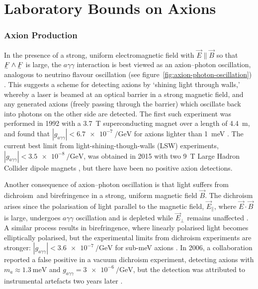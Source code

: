 \section{Laboratory Bounds on Axions}

\subsubsection{Axion Production}
In the presence of a strong, uniform electromagnetic field with $\vec E \parallel \vec B$ so that $\ts F\wedge\ts F$ is large, the $aγγ$ interaction is best viewed as an axion--photon oscillation, analogous to neutrino flavour oscillation (see figure~\ref{fig:axion-photon-oscillation}) \cite[§\,91.3.1]{ParticleDataGroup-review-2020}.
This suggests a scheme for detecting axions by `shining light through walls,' whereby a laser is beamed at an optical barrier in a strong magnetic field, and any generated axions (freely passing through the barrier) which oscillate back into photons on the other side are detected.
The first such experiment was performed in 1992 with a \SI{3.7}{\tesla} superconducting magnet over a length of \SI{4.4}{\meter}, and found that $|g_{aγγ}| < \SI{6.7e-7}{\per\giga\eV}$ for axions lighter than \SI{1}{\milli\eV} \cite{first-LSW-experiment}.
The current best limit from light-shining-though-walls (LSW) experiments, $|g_{aγγ}| < \SI{3.5e-8}{\per\giga\eV}$, was obtained in 2015 with two \SI{9}{\tesla} Large Hadron Collider dipole magnets \cite{best-LSW-experiment}, but there have been no positive axion detections.

Another consequence of axion--photon oscillation is that light suffers from dichroism\footnotemark\ and birefringence in a strong, uniform magnetic field $\vec B$.
The dichroism arises since the polarisation of light parallel to the magnetic field, $\vec E_\parallel$, where $\vec E \cdot \vec B$ is large, undergoes $aγγ$ oscillation and is depleted while $\vec E_\perp$ remains unaffected \cite[§\,91.3.2]{ParticleDataGroup-review-2020}.
A similar process results in birefringence, where linearly polarised light becomes elliptically polarised, but the experimental limits from dichroism experiments are stronger: $|g_{aγγ}| < \SI{3.6e-7}{\per\giga\eV}$ for sub-\si{\milli\eV} axions \cite{axion_dichromism}.
In 2006, a collaboration reported a false positive in a vacuum dichroism experiment, detecting axions with $m_a \approx \SI{1.3}{\milli\eV}$ and $g_{aγγ} = \SI{3e-6}{\per\giga\eV}$, but the detection was attributed to instrumental artefacts two years later \cite{birefringence_false_positive_2008}.



